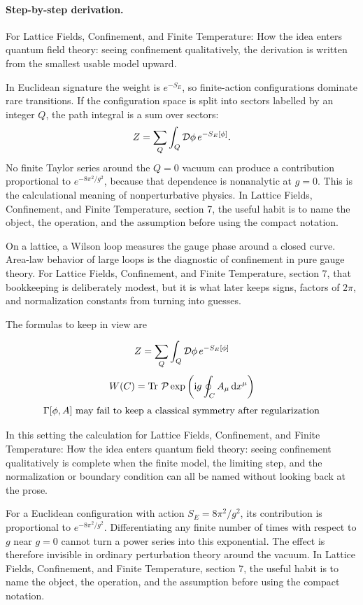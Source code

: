 \paragraph{Step-by-step derivation.}

For Lattice Fields, Confinement, and Finite Temperature: How the idea enters quantum field theory: seeing confinement qualitatively, the derivation is written from the smallest usable model upward.

In Euclidean signature the weight is \(e^{-S_E}\), so finite-action configurations dominate rare transitions.  If the configuration space is split into sectors labelled by an integer \(Q\), the path integral is a sum over sectors:
\[
  Z=\sum_Q\int_Q\mathcal D\phi\,e^{-S_E[\phi]}.
\]
No finite Taylor series around the \(Q=0\) vacuum can produce a contribution proportional to \(e^{-8\pi^2/g^2}\), because that dependence is nonanalytic at \(g=0\).  This is the calculational meaning of nonperturbative physics.  In Lattice Fields, Confinement, and Finite Temperature, section 7, the useful habit is to name the object, the operation, and the assumption before using the compact notation.

On a lattice, a Wilson loop measures the gauge phase around a closed curve.  Area-law behavior of large loops is the diagnostic of confinement in pure gauge theory.  For Lattice Fields, Confinement, and Finite Temperature, section 7, that bookkeeping is deliberately modest, but it is what later keeps signs, factors of \(2\pi\), and normalization constants from turning into guesses.

The formulas to keep in view are

\[
  Z=\sum_Q\int_Q\mathcal D\phi\,e^{-S_E[\phi]}
\]
\[
  W(C)=\operatorname{Tr}\,\mathcal P\exp\left(\mathrm i g\oint_C A_\mu\,\mathrm d x^\mu\right)
\]
\[
  \Gamma[\phi,A]\hbox{ may fail to keep a classical symmetry after regularization}
\]

In this setting the calculation for Lattice Fields, Confinement, and Finite Temperature: How the idea enters quantum field theory: seeing confinement qualitatively is complete when the finite model, the limiting step, and the normalization or boundary condition can all be named without looking back at the prose.




\begin{example}
For a Euclidean configuration with action \(S_E=8\pi^2/g^2\), its contribution is proportional to \(e^{-8\pi^2/g^2}\).  Differentiating any finite number of times with respect to \(g\) near \(g=0\) cannot turn a power series into this exponential.  The effect is therefore invisible in ordinary perturbation theory around the vacuum.  In Lattice Fields, Confinement, and Finite Temperature, section 7, the useful habit is to name the object, the operation, and the assumption before using the compact notation.
\end{example}



